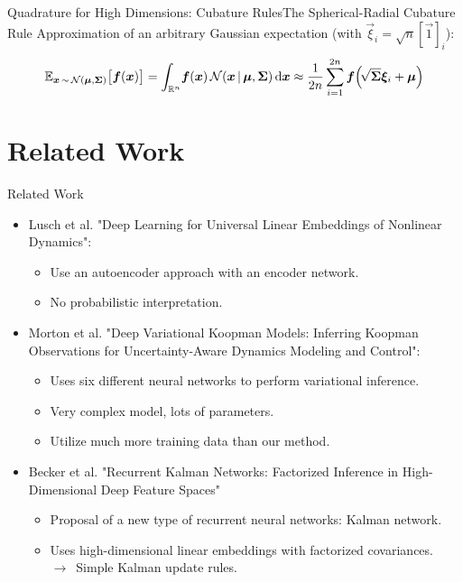 \documentclass[
	aspectratio=43,
	color={accentcolor=1c},
	logo=false,
	colorframetitle=true,
]{tudabeamer}
\begin{document}
\begin{frame}{Quadrature for High Dimensions: Cubature Rules}{The Spherical-Radial Cubature Rule}
			\vspace{0.3cm}
			Approximation of an arbitrary Gaussian expectation (with \( \vec{\xi}_i = \sqrt{n} [\vec{1}]_i \)):
			\vspace{-0.1cm}
			\begin{equation*}
				\mathbb{E}_{\bm{x} \,\sim\, \mathcal{N}(\bm{\mu}, \bm{\Sigma})}\big[ \bm{f}(\bm{x}) \big]
					= \int_{\mathbb{R}^n} \! \bm{f}(\bm{x}) \, \mathcal{N}(\bm{x} \,\vert\, \bm{\mu}, \bm{\Sigma}) \dd{\bm{x}}
					\approx \frac{1}{2n} \sum_{i = 1}^{2n} \bm{f}\Big(\! \sqrt{\bm{\Sigma}} \bm{\xi}_i + \bm{\mu} \Big)
			\end{equation*}
		\end{frame}

	\section{Related Work}
		\begin{frame}{Related Work}
			\begin{itemize}
				\item<+-> Lusch et al. "Deep Learning for Universal Linear Embeddings of Nonlinear Dynamics":
					\begin{itemize}
						\item Use an autoencoder approach with an encoder network.
						\item No probabilistic interpretation.
					\end{itemize}
				\item<+-> Morton et al. "Deep Variational Koopman Models: Inferring Koopman Observations for Uncertainty-Aware Dynamics Modeling and Control":
					\begin{itemize}
						\item Uses six different neural networks to perform variational inference.
						\item Very complex model, lots of parameters.
						\item Utilize much more training data than our method.
					\end{itemize}
				\item<+-> Becker et al. "Recurrent Kalman Networks: Factorized Inference in High-Dimensional Deep Feature Spaces"
					\begin{itemize}
						\item Proposal of a new type of recurrent neural networks: Kalman network.
						\item Uses high-dimensional linear embeddings with factorized covariances. \\
						\quad \(\longrightarrow\,\) Simple Kalman update rules.
					\end{itemize}
			\end{itemize}
		\end{frame}
\end{document}
